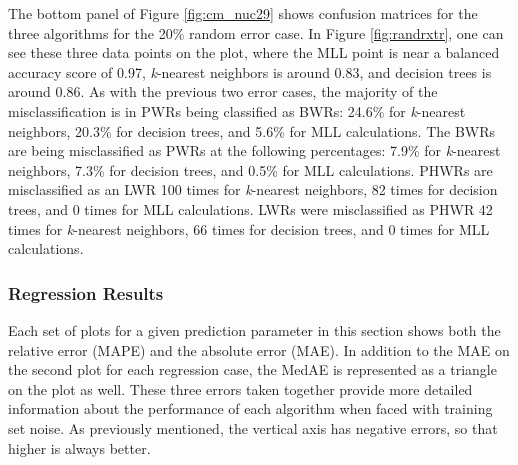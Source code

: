 The bottom panel of Figure \ref{fig:cm_nuc29} shows confusion matrices for the
three algorithms for the 20\% random error case. In Figure \ref{fig:randrxtr},
one can see these three data points on the plot, where the \gls{MLL} point is
near a balanced accuracy score of 0.97, \textit{k}-nearest neighbors is around
0.83, and decision trees is around 0.86. As with the previous two error cases,
the majority of the misclassification is in \gls{PWR}s being classified as
\gls{BWR}s: 24.6\% for \textit{k}-nearest neighbors, 20.3\% for decision trees,
and 5.6\% for \gls{MLL} calculations.  The \gls{BWR}s are being misclassified
as \gls{PWR}s at the following percentages: 7.9\% for \textit{k}-nearest
neighbors, 7.3\% for decision trees, and 0.5\% for \gls{MLL} calculations.
\Gls{PHWR}s are misclassified as an \gls{LWR} 100 times for \textit{k}-nearest
neighbors, 82 times for decision trees, and 0 times for \gls{MLL} calculations.
\Gls{LWR}s were misclassified as \gls{PHWR} 42 times for \textit{k}-nearest
neighbors, 66 times for decision trees, and 0 times for \gls{MLL} calculations.

\subsubsection{Regression Results}
\label{sec:randerrB}

Each set of plots for a given prediction parameter in this section shows both
the relative error (\gls{MAPE}) and the absolute error (\gls{MAE}). In addition
to the \gls{MAE} on the second plot for each regression case, the \gls{MedAE}
is represented as a triangle on the plot as well. These three errors taken
together provide more detailed information about the performance of each
algorithm when faced with training set noise.  As previously mentioned, the
vertical axis has negative errors, so that higher is always better.  

